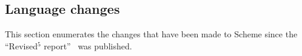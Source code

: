 


\subsection*{Language changes}
\label{differences}

This section enumerates the changes that have been made to Scheme since
the ``Revised$^5$ report''~\cite{R5RS} was published.









